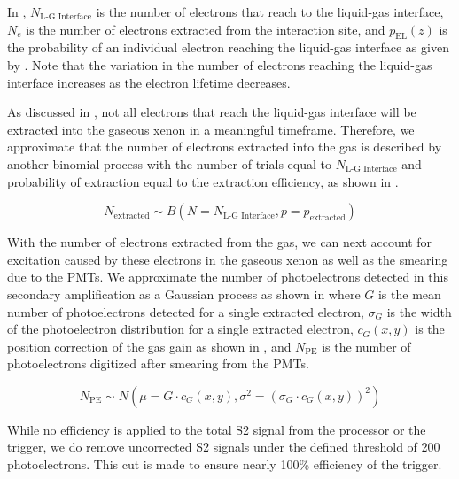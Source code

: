 In , $N_{\textrm{L-G Interface}}$ is the number of electrons that reach to the liquid-gas interface, $N_e$ is the number of electrons extracted from the interaction site, and $p_{\textrm{EL}}(z)$ is the probability of an individual electron reaching the liquid-gas interface as given by .  Note that the variation in the number of electrons reaching the liquid-gas interface increases as the electron lifetime decreases.

As discussed in , not all electrons that reach the liquid-gas interface will be extracted into the gaseous xenon in a meaningful timeframe.  Therefore, we approximate that the number of electrons extracted into the gas is described by another binomial process with the number of trials equal to $N_{\textrm{L-G Interface}}$ and probability of extraction equal to the extraction efficiency, as shown in .

\begin{equation}
        \label{eqn:xe1t_binomial_ee}
        N_{\textrm{extracted}} \sim B \left( N= N_{\textrm{L-G Interface}}, p=p_{\textrm{extracted}} \right)
\end{equation}


With the number of electrons extracted from the gas, we can next account for excitation caused by these electrons in the gaseous xenon as well as the smearing due to the PMTs.  We approximate the number of photoelectrons detected in this secondary amplification as a Gaussian process as shown in  where $G$ is the mean number of photoelectrons detected for a single extracted electron, $\sigma_G$ is the width of the photoelectron distribution for a single extracted electron, $c_{G}(x, y)$ is the position correction of the gas gain as shown in , and $N_{\textrm{PE}}$ is the number of photoelectrons digitized after smearing from the PMTs.

\begin{equation}
        \label{eqn:xe1t_gas_gain}
        N_{\textrm{PE}} \sim N(\mu=G \cdot c_{G}(x, y), \sigma^2=(\sigma_G \cdot c_{G}(x, y))^2)
\end{equation}


While no efficiency is applied to the total S2 signal from the processor or the trigger, we do remove uncorrected S2 signals under the defined threshold of 200 photoelectrons.  This cut is made to ensure nearly 100\% efficiency of the trigger.


